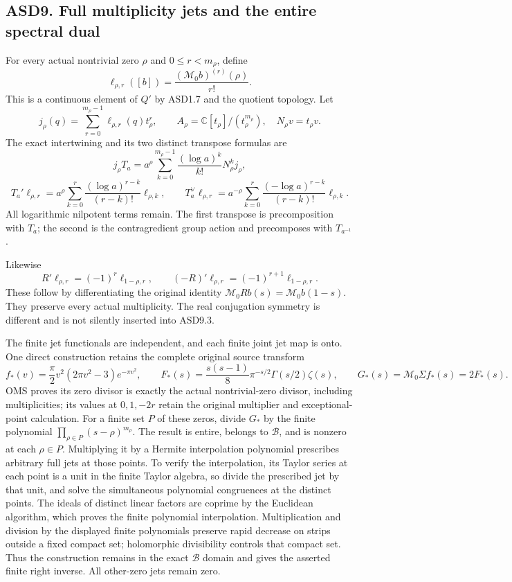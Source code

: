\subsection{ASD9. Full multiplicity jets and the entire spectral
dual}\label{asd9.-full-multiplicity-jets-and-the-entire-spectral-dual}

For every actual nontrivial zero \(\rho\) and \(0\le r<m_\rho\), define
\[
 \ell_{\rho,r}([b])
 =\frac{(\mathcal M_0b)^{(r)}(\rho)}{r!}.
 \tag{ASD9.1}
\] This is a continuous element of \(Q'\) by ASD1.7 and the quotient
topology. Let \[
 j_\rho(q)=\sum_{r=0}^{m_\rho-1}\ell_{\rho,r}(q)t_\rho^r,\qquad
 A_\rho=\mathbb C[t_\rho]/(t_\rho^{m_\rho}),\quad
 N_\rho v=t_\rho v.
\] The exact intertwining and its two distinct transpose formulas are \[
 j_\rho T_a
 =a^\rho\sum_{k=0}^{m_\rho-1}\frac{(\log a)^k}{k!}N_\rho^k j_\rho,
\] \[
 T_a'\ell_{\rho,r}
 =a^\rho\sum_{k=0}^{r}
       \frac{(\log a)^{r-k}}{(r-k)!}\ell_{\rho,k},
\qquad
 T_a^\vee\ell_{\rho,r}
 =a^{-\rho}\sum_{k=0}^{r}
       \frac{(-\log a)^{r-k}}{(r-k)!}\ell_{\rho,k}.
 \tag{ASD9.2}
\] All logarithmic nilpotent terms remain. The first transpose is
precomposition with \(T_a\); the second is the contragredient group
action and precomposes with \(T_{a^{-1}}\).

Likewise \[
 R'\ell_{\rho,r}=(-1)^r\ell_{1-\rho,r},\qquad
 (-R)'\ell_{\rho,r}=(-1)^{r+1}\ell_{1-\rho,r}.
 \tag{ASD9.3}
\] These follow by differentiating the original identity
\(\mathcal M_0Rb(s)=\mathcal M_0b(1-s)\). They preserve every actual
multiplicity. The real conjugation symmetry is different and is not
silently inserted into ASD9.3.

The finite jet functionals are independent, and each finite joint jet
map is onto. One direct construction retains the complete original
source transform \[
 f_*(v)=\frac{\pi}{2}v^2(2\pi v^2-3)e^{-\pi v^2},\qquad
 F_*(s)=\frac{s(s-1)}8\pi^{-s/2}\Gamma(s/2)\zeta(s),
 \qquad
 G_*(s)=\mathcal M_0\Sigma f_*(s)=2F_*(s).
 \tag{ASD9.4}
\] OMS proves its zero divisor is exactly the actual nontrivial-zero
divisor, including multiplicities; its values at \(0,1,-2r\) retain the
original multiplier and exceptional-point calculation. For a finite set
\(P\) of these zeros, divide \(G_*\) by the finite polynomial
\(\prod_{\rho\in P}(s-\rho)^{m_\rho}\). The result is entire, belongs to
\(\mathcal B\), and is nonzero at each \(\rho\in P\). Multiplying it by
a Hermite interpolation polynomial prescribes arbitrary full jets at
those points. To verify the interpolation, its Taylor series at each
point is a unit in the finite Taylor algebra, so divide the prescribed
jet by that unit, and solve the simultaneous polynomial congruences at
the distinct points. The ideals of distinct linear factors are coprime
by the Euclidean algorithm, which proves the finite polynomial
interpolation. Multiplication and division by the displayed finite
polynomials preserve rapid decrease on strips outside a fixed compact
set; holomorphic divisibility controls that compact set. Thus the
construction remains in the exact \(\mathcal B\) domain and gives the
asserted finite right inverse. All other-zero jets remain zero.

